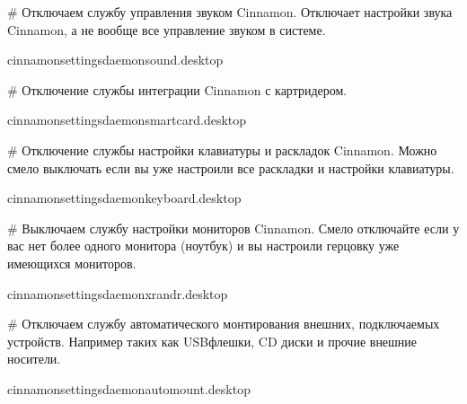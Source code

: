 \documentclass[letterpaper,10pt,russian,openany]{sphinxmanual}
\begin{document}
\sphinxAtStartPar
\# Отключаем службу управления звуком Cinnamon.
Отключает  настройки звука Cinnamon, а не вообще все управление звуком в системе.

\begin{sphinxVerbatim}[commandchars=\\\{\}]
  \PYGZgt{}\PYGZgt{} cinnamon\PYGZhy{}settings\PYGZhy{}daemon\PYGZhy{}sound.desktop
\end{sphinxVerbatim}

\sphinxAtStartPar
\# Отключение службы интеграции Cinnamon с картридером.

\begin{sphinxVerbatim}[commandchars=\\\{\}]
  \PYGZgt{}\PYGZgt{} cinnamon\PYGZhy{}settings\PYGZhy{}daemon\PYGZhy{}smartcard.desktop
\end{sphinxVerbatim}

\sphinxAtStartPar
\# Отключение службы настройки клавиатуры и раскладок Cinnamon.
Можно смело выключать если вы уже настроили все раскладки и настройки клавиатуры.

\begin{sphinxVerbatim}[commandchars=\\\{\}]
  \PYGZgt{}\PYGZgt{} cinnamon\PYGZhy{}settings\PYGZhy{}daemon\PYGZhy{}keyboard.desktop
\end{sphinxVerbatim}

\sphinxAtStartPar
\# Выключаем службу настройки мониторов Cinnamon.
Смело отключайте если у вас нет более одного монитора (ноутбук) и вы настроили герцовку уже имеющихся мониторов.

\begin{sphinxVerbatim}[commandchars=\\\{\}]
  \PYGZgt{}\PYGZgt{} cinnamon\PYGZhy{}settings\PYGZhy{}daemon\PYGZhy{}xrandr.desktop
\end{sphinxVerbatim}

\sphinxAtStartPar
\# Отключаем службу автоматического монтирования внешних, подключаемых устройств.
Например таких как USB\sphinxhyphen{}флешки, CD диски и прочие внешние носители.

\begin{sphinxVerbatim}[commandchars=\\\{\}]
  \PYGZgt{}\PYGZgt{} cinnamon\PYGZhy{}settings\PYGZhy{}daemon\PYGZhy{}automount.desktop
\end{sphinxVerbatim}
\end{document}
